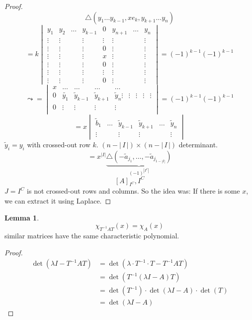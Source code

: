 \documentclass[a4paper,landscape,twocolumn]{article}
\newcommand\abs[1]{|\,#1\,|}
\theoremstyle{definition}
\newtheorem{lemma}{Lemma}
\begin{document}
\begin{proof}
  \[
    \triangle(y_1 \ldots y_{k-1}, xe_k, y_{k+1} \ldots y_n)
  \] \[
    = k \begin{vmatrix}
      y_1 & y_2 & \ldots & y_{k-1} & 0 & y_{n+1} & \ldots & y_n \\
      \vdots & \vdots &  & \vdots  & \vdots & \vdots &    & \vdots \\
      \vdots & \vdots &  & \vdots  & 0      & \vdots &    & \vdots \\
      \vdots & \vdots &  & \vdots  & x      & \vdots &    & \vdots \\
      \vdots & \vdots &  & \vdots  & 0      & \vdots &    & \vdots \\
      \vdots & \vdots &  & \vdots  & \vdots & \vdots &    & \vdots \\
      \vdots & \vdots &  & \vdots  & 0      & \vdots &    & \vdots
    \end{vmatrix}
    = (-1)^{k-1} (-1)^{k-1}
  \] \[
    \leadsto
    = \begin{vmatrix}
      x      & \ldots      & \ldots          & \ldots          & \ldots \\
      0      & \tilde{y_1} & \tilde{y}_{k-1} & \tilde{y}_{k+1} & \tilde{y}_n
      \vdots & \vdots      & \vdots          & \vdots          & \vdots \\
      0      & \vdots      & \vdots          & \vdots          & \vdots \\
    \end{vmatrix}
    = (-1)^{k-1} (-1)^{k-1}
  \] \[
    = x \begin{vmatrix}
      \tilde{b}_1 & \ldots & \tilde{y}_{k-1} & \tilde{y}_{k+1} & \ldots & \tilde{y}_n \\
      \vdots &             & \vdots          & \vdots          &        & \vdots
    \end{vmatrix}
  \]
  $\tilde{y}_i = y_i$ with crossed-out row $k$.
  $(n - \abs{I}) \times (n - \abs{I})$ determinant.
  \[ = x^{|I|} \underbrace{\triangle(-\tilde{a}_{j_1}, \ldots, -\tilde{a}_{j_{1 - |I|}})}_{(-1)^{|I^C|}} \]
  \[ [A]_{I^C}, I^C \]
  $J = I^C$ is not crossed-out rows and columns.
  So the idea was: If there is some $x$, we can extract it using Laplace.
\end{proof}

\begin{lemma}
  \label{lemma-10.13}
  \[ \chi_{T^{-1} AT}(x) = \chi_A(x) \]
  similar matrices have the same characteristic polynomial.
\end{lemma}
\begin{proof}
  \begin{align*}
    \det(\lambda I - T^{-1} A T)
      &= \det(\lambda \cdot T^{-1} \cdot T - T^{-1} AT) \\
      &= \det(T^{-1} (\lambda I - A) T) \\
      &= \det(T^{-1}) \cdot \det(\lambda I - A) \cdot \det(T) \\
      &= \det(\lambda I - A)
  \end{align*}
\end{proof}
\end{document}
